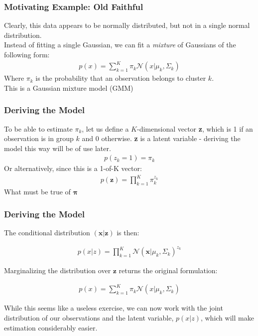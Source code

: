 \documentclass{beamer}
\begin{document}
\begin{frame}
\frametitle{Motivating Example: Old Faithful}
Clearly, this data appears to be normally distributed, but not in a single normal distribution.\\
Instead of fitting a single Gaussian, we can fit a \textit{mixture} of Gaussians of the following form:
\begin{align*}
p(x) = \sum_{k=1}^{K} \pi_k \mathcal{N} (x | \mu_k, \Sigma_k)
\end{align*}
Where $\pi_k$ is the probability that an observation belongs to cluster $k$. \\
This is a Gaussian mixture model (GMM)
\end{frame}

\begin{frame}
\frametitle{Deriving the Model}
	To be able to estimate $\pi_k$, let us define a $K$-dimensional vector \textbf{z}, which is 1 if an observation is in group $k$ and 0 otherwise. \textbf{z} is a latent variable - deriving the model this way will be of use later.\\
	\begin{align*}
	p(z_k = 1) = \pi_k
	\end{align*}
	Or alternatively, since this is a 1-of-K vector:
	\begin{align*}
	p(\mathbf{z})  = \prod_{k = 1}^{K} \pi_k^{z_k}
	\end{align*}
	What must be true of $\mathbf{\pi}$

\end{frame}

 \begin{frame}
 \frametitle{Deriving the Model}
 
 	The conditional distribution $(\mathbf{x} | \mathbf{z})$ is then:

 	\begin{align*}
 	p(x|z) = \prod_{k = 1}^{K} \mathcal{N}(\mathbf{x} | \mu_k, \Sigma_k)^{z_k}
 	\end{align*}
 	
 	Marginalizing the distribution over $\mathbf{z}$ returns the original formulation:
 	
 	\begin{align*}
 	p(x) = \sum_{k=1}^{K} \pi_k \mathcal{N} (x | \mu_k, \Sigma_k)
 	\end{align*}
 	
 	While this seems like a useless exercise, we can now work with the joint distribution of our observations and the latent variable, $p(x|z)$, which will make estimation considerably easier.
 
 \end{frame}
\end{document}
